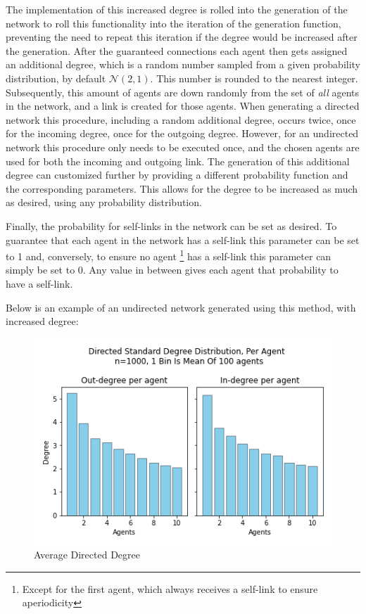 \documentclass{article}
\begin{document}
\newpage

The implementation of this increased degree is rolled into the generation of the network to roll this functionality into the iteration of the generation function, preventing the need to repeat this iteration if the degree would be increased after the generation. After the guaranteed connections each agent then gets assigned an additional degree, which is a random number sampled from a given probability distribution, by default $\mathcal{N}(2,1)$. This number is rounded to the nearest integer. Subsequently, this amount of agents are down randomly from the set of \emph{all} agents in the network, and a link is created for those agents. When generating a directed network this procedure, including a random additional degree, occurs twice, once for the incoming degree, once for the outgoing degree. However, for an undirected network this procedure only needs to be executed once, and the chosen agents are used for both the incoming and outgoing link. \newline
The generation of this additional degree can customized further by providing a different probability function and the corresponding parameters. This allows for the degree to be increased as much as desired, using any probability distribution.\newline

Finally, the probability for self-links in the network can be set as desired. To guarantee that each agent in the network has a self-link this parameter can be set to 1 and, conversely, to ensure no agent \footnote{Except for the first agent, which always receives a self-link to ensure aperiodicity} has a self-link this parameter can simply be set to 0. Any value in between gives each agent that probability to have a self-link.

Below is an example of an undirected network generated using this method, with increased degree:
\begin{center}
    \begin{figure}[!htbp]
        \centering
        \includegraphics[width=.8\textwidth]{ThesisKI/Images/DirectedStandardPerAgent.png}
        \caption{Average Directed Degree}
        \label{degree:agent}
    \end{figure}
\end{center}
\end{document}
